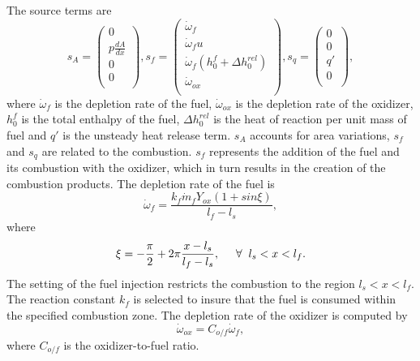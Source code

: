 The source terms are
\begin{equation} \label{eq:5p2.3}
s_A = \left( \begin{gathered}
0  \\
p \frac{dA}{dx}  \\
0  \\
0 \\
\end{gathered} \right), 
s_f = \left( \begin{gathered}
{\dot \omega}_f  \\
{\dot \omega}_f u  \\
{\dot \omega}_f \left(h_{0}^{f} + \Delta h_{0}^{rel} \right)  \\
{\dot \omega}_{ox} \\
\end{gathered} \right), 
{s_q} = \left( \begin{gathered}
0  \\
0  \\
q'  \\
0 \\
\end{gathered} \right),
\end{equation}
where $\dot{\omega}_f$ is the depletion rate of the fuel, $\dot{\omega}_{ox}$ is the depletion rate of the oxidizer, $h_0^f$ is the total enthalpy of the fuel, $\Delta h_{0}^{rel}$ is the heat of reaction per unit mass of fuel and $q'$ is the unsteady heat release term. $s_A$ accounts for area variations, $s_f$ and $s_q$ are related to the combustion. $s_f$ represents the addition of the fuel and its combustion with the oxidizer, which in turn results in the creation of the combustion products. The depletion rate of the fuel is
\begin{equation}\label{eq:5p2.4}
\dot{\omega}_{f}= \frac{k_f \dot{m}_f Y_{ox} \left(1+sin\xi\right)}{l_f-l_s},
\end{equation} 
where
\begin{equation}\label{eq:5p2.5}
\xi= -\frac{\pi}{2} + 2\pi\frac{x-l_s}{l_f-l_s}, \hspace{0.5cm} \forall \hspace{0.2cm} l_s < x < l_f.
\end{equation}
The setting of the fuel injection restricts the combustion to the region $l_s < x < l_f$. The reaction constant $k_f$ is selected to insure that the fuel is consumed within the specified combustion zone. The depletion rate of the oxidizer is computed by 
\begin{equation}\label{eq:5p2.6}
\dot{\omega}_{ox} = C_{o/f} \dot{\omega}_f,
\end{equation}
where $C_{o/f}$ is the oxidizer-to-fuel ratio.

